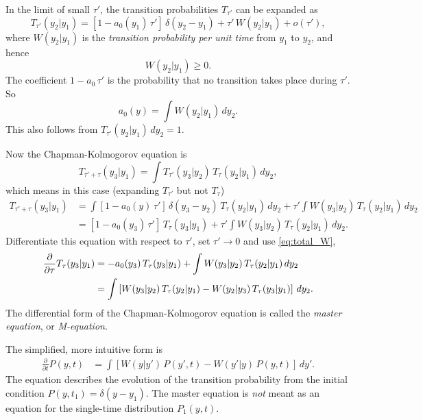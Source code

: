 \documentclass{book}
\numberwithin{equation}{section}
\theoremstyle{plain}
\theoremstyle{definition}
\theoremstyle{remark}
\begin{document}
In the limit of small $\tau'$,
the transition probabilities $T_{\tau'}$ can be expanded as
%
\begin{equation}
  T_{\tau'}(y_2 | y_1)
  =
  \left[1 - a_0(y_1) \, \tau'\right] \, \delta(y_2 - y_1)
  +
  \tau' \, W(y_2 | y_1) + o(\tau'),
  \label{eq:transproba_smallt}
\end{equation}
%
where $W(y_2 | y_1)$ is the \emph{transition probability per unit time}
from $y_1$ to $y_2$,
and hence
%
\begin{equation}
  W(y_2 | y_1) \ge 0.
  \label{eq:W_positive}
\end{equation}
%
The coefficient $1-a_0\, \tau'$ is the probability that no transition takes place
during $\tau'$.  So
%
\begin{equation}
  a_0(y)
  =
  \int W(y_2 | y_1) \, dy_2.
  \label{eq:total_W}
\end{equation}
%
This also follows from $T_{\tau'}(y_2 | y_1) \, dy_2 = 1$.



Now the Chapman-Kolmogorov equation is
\begin{equation}
  T_{\tau' + \tau}(y_3 | y_1)
  =
  \int T_{\tau'}(y_3 | y_2) \, T_\tau(y_2 | y_1) \, dy_2,
  \tag{IV.3.2}
  \label{eq:ChapmanKolmogorov}
\end{equation}
which means in this case (expanding $T_{\tau'}$ but not $T_\tau$)
{\footnotesize
$$
\begin{aligned}
  T_{\tau' + \tau}(y_3 | y_1)
  &=
  \int \left[1 - a_0(y) \, \tau'\right] \, \delta(y_3 - y_2) \, T_\tau(y_2 | y_1) \, dy_2
  +
  \tau' \int W(y_3|y_2) \, T_\tau(y_2 | y_1) \, dy_2
  \\
  &=
  \left[1 - a_0(y_3) \, \tau'\right] \, T_\tau(y_3 | y_1)
  +
  \tau' \int W(y_3 | y_2) \, T_\tau(y_2 | y_1) \, dy_2.
\end{aligned}
$$
}
Differentiate this equation with respect to $\tau'$,
set $\tau' \to 0$ and use \eqref{eq:total_W},
\begin{align}
\frac{ \partial } { \partial \tau } T_\tau(y_3 | y_1 )
&=
-a_0(y_3) \, T_\tau(y_3 | y_1)
+
\int W(y_3 | y_2) \, T_\tau(y_2 | y_1) \, dy_2
\notag \\
&=
\int
\left[
  W(y_3 | y_2) \, T_\tau(y_2 | y_1)
  -
  W(y_2 | y_3) \, T_\tau(y_3 | y_1)
\right] \, dy_2.
\label{eq:master_equation_T}
\end{align}
%
The differential form of the Chapman-Kolmogorov equation
is called the \emph{master equation},
or \emph{M-equation}.

The simplified, more intuitive form is
%
\begin{align}
  \frac{ \partial } { \partial t } P(y, t)
&=
\int
\left[
  W(y | y') \, P(y', t)
  -
  W(y' | y) \, P(y, t)
\right] \, dy'.
\label{eq:master_equation_continuous}
\end{align}
%
The equation describes the evolution of
the transition probability
from the initial condition $P(y, t_1) = \delta(y - y_1)$.
%
The master equation is \emph{not} meant as an equation
for the single-time distribution $P_1(y, t)$.
\end{document}
